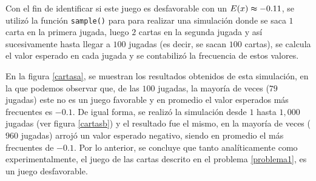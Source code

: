\documentclass{article}
\begin{document}
Con el fin de identificar si este juego es desfavorable con un $E{(x)} \thickapprox -0.11$,  se utilizó la función \texttt{sample()} para para realizar una simulación donde se saca $1$ carta en la primera jugada, luego $2$ cartas en la segunda jugada y así sucesivamente hasta llegar a $100$ jugadas (es decir, se sacan $100$ cartas), se calcula el valor esperado en cada jugada y se contabilizó la frecuencia de estos valores. 

En la figura \ref{cartasa}, se muestran los resultados obtenidos de esta simulación, en la que podemos observar que, de las $100$ jugadas, la mayoría de veces ($79$ jugadas) este no es un juego favorable y en promedio el valor esperados más frecuentes es $-0.1$. De igual forma, se realizó la simulación desde $1$ hasta $1,000$ jugadas (ver figura \ref{cartasb}) y el resultado fue el mismo, en la mayoría de veces ($960$ jugadas) arrojó un valor esperado negativo, siendo en promedio el más frecuentes de $-0.1$. Por lo anterior, se concluye que tanto analíticamente como experimentalmente, el juego de las cartas descrito en el problema \ref{problema1}, es un juego desfavorable.
\end{document}
